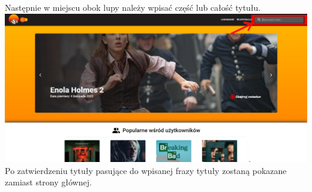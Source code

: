 \documentclass[12pt]{article}
\begin{document}
\begin{flushleft}
\begin{itemize}
			Następnie w miejscu obok lupy należy wpisać część lub całość tytułu. \linebreak	
			\includegraphics[scale=0.3]{WyszukiwanieTytul2.png} \linebreak
			Po zatwierdzeniu tytuły pasujące do wpisanej frazy tytuły zostaną pokazane zamiast strony głównej. \linebreak
		\end{itemize}

\end{flushleft}
\end{document}

